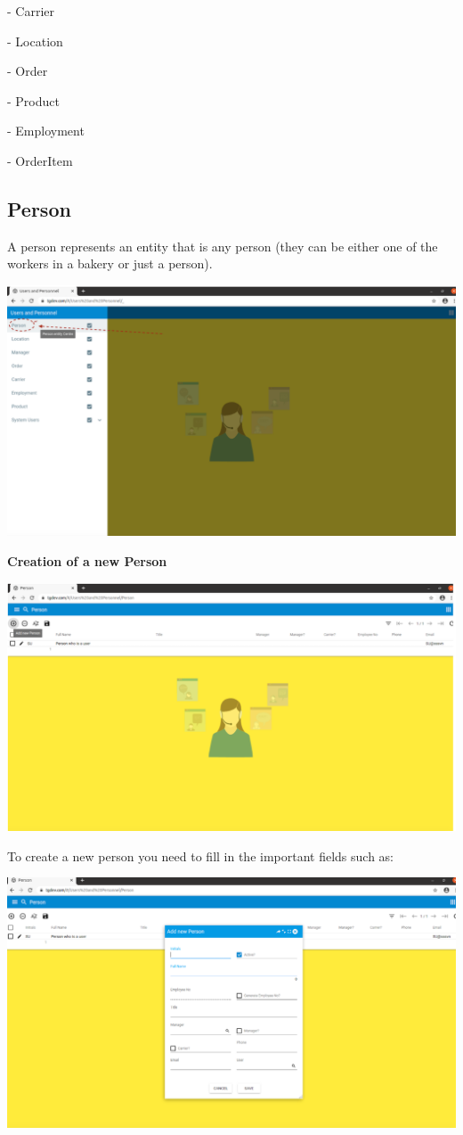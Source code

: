 - Carrier

- Location

- Order

- Product

- Employment

- OrderItem

\subsection{Person}
A person represents an entity that is any person (they can be either one of the workers in a bakery or just a person).

\includegraphics[width=\textwidth]{sections/01-chapter/images/person1.png}

\textbf{Creation of a new Person}

\includegraphics[width=\textwidth]{sections/01-chapter/images/person2.png}

To create a new person you need to  fill in the important fields such as:

\includegraphics[width=\textwidth]{sections/01-chapter/images/person3.png}

